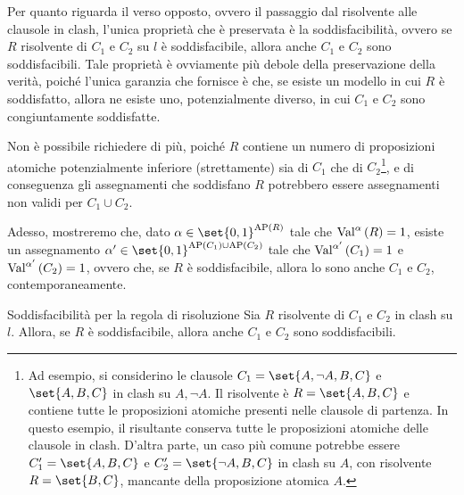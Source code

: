 Per quanto riguarda il verso opposto, ovvero il passaggio dal risolvente alle clausole in clash, l'unica proprietà che è preservata è la soddisfacibilità, ovvero se \(R\) risolvente di \(C_1\) e \(C_2\) su \(l\) è soddisfacibile, allora anche \(C_1\) e \(C_2\) sono soddisfacibili. Tale proprietà è ovviamente più debole della preservazione della verità, poiché l'unica garanzia che fornisce è che, se esiste un modello in cui \(R\) è soddisfatto, allora ne esiste uno, potenzialmente diverso, in cui \(C_1\) e \(C_2\) sono congiuntamente soddisfatte.

Non è possibile richiedere di più, poiché \(R\) contiene un numero di proposizioni atomiche potenzialmente inferiore (strettamente) sia di \(C_1\) che di \(C_2\)\footnote{Ad esempio, si considerino le clausole \(C_1 = \set{A, \neg A, B, C}\) e \(\set{A, B, C}\) in clash su \(A, \neg A\). Il risolvente è \(R=\set{A,B,C}\) e contiene tutte le proposizioni atomiche presenti nelle clausole di partenza. In questo esempio, il risultante conserva tutte le proposizioni atomiche delle clausole in clash. D'altra parte, un caso più comune potrebbe essere \(C_1'=\set{A, B, C}\) e \(C_2'=\set{\neg A, B, C}\) in clash su \(A\), con risolvente \(R=\set{B, C}\), mancante della proposizione atomica \(A\).}, e di conseguenza gli assegnamenti che soddisfano \(R\) potrebbero essere assegnamenti non validi per \(C_1\cup C_2\). 

Adesso, mostreremo che, dato \(\alpha\in \set{0,1}^{\AP[R]}\) tale che \(\Val{\alpha}[R] = 1\), esiste un assegnamento \(\alpha'\in\set{0,1}^{\AP[C_1]\cup\AP[C_2]}\) tale che \(\Val{\alpha'}[C_1] = 1\) e \(\Val{\alpha'}[C_2] = 1\), ovvero che, se \(R\) è soddisfacibile, allora lo sono anche \(C_1\) e \(C_2\), contemporaneamente.

\begin{proposition}{Soddisfacibilità per la regola di risoluzione}
  Sia \(R\) risolvente di \(C_1\) e \(C_2\) in clash su \(l\). Allora, se \(R\) è soddisfacibile, allora anche \(C_1\) e \(C_2\) sono soddisfacibili.
\end{proposition}

